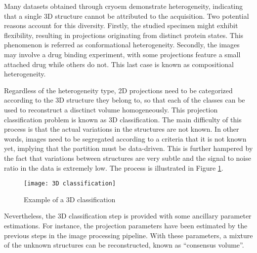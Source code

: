 \documentclass[../main.tex]{subfiles}
\begin{document}
Many datasets obtained through \gls{cryoem} demonstrate heterogeneity, indicating that a single 3D structure cannot be attributed to the acquisition. Two potential reasons account for this diversity. Firstly, the studied specimen might exhibit flexibility, resulting in projections originating from distinct protein states. This  phenomenon is referred as conformational heterogeneity. Secondly, the images may involve a drug binding experiment, with some projections feature a small attached drug while others do not. This last case is known as compositional heterogeneity.

Regardless of the heterogeneity type, 2D projections need to be categorized according to the 3D structure they belong to, so that each of the classes can be used to reconstruct a disctinct volume homogeneously. This projection classification problem is known as 3D classification. The main difficulty of this process is that the actual variations in the structures are not known. In other words, images need to be segregated according to a criteria that it is not known yet, implying that the partition must be data-driven. This is further hampered by the fact that variations between structures are very subtle and the signal to noise ratio in the data is extremely low. The process is illustrated in Figure \ref{fig:1.1:3d_classification}.

\begin{figure}[hbp]
    \centering
    \texttt{[image: 3D classification]}
    \caption{Example of a 3D classification}
    \label{fig:1.1:3d_classification}
\end{figure}

Nevertheless, the 3D classification step is provided with some ancillary parameter estimations. For instance, the projection parameters have been estimated by the previous steps in the image processing pipeline. With these parameters, a mixture of the unknown structures can be reconstructed, known as ``consensus volume''.
\end{document}
